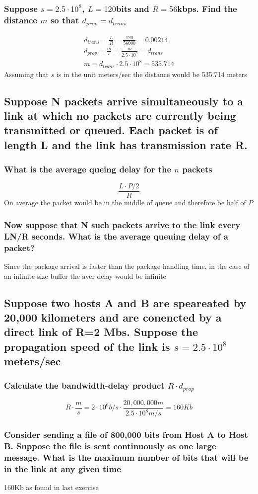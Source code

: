 \documentclass[12pt, a4paper]{article}
\begin{document}
			\subsubsection{Suppose $s=2.5\cdot 10^8$, $L=120$bits and $R=56$kbps. Find the distance $m$ so that $d_{prop}=d_{trans}$}
				\begin{align*}
					d_{trans}=\frac{L}{R}=\frac{120}{56000}=0.00214\\
					d_{prop}=\frac{m}{s}=\frac{m}{2.5\cdot 10^8}=d_{trans}\\
					m=d_{trans}\cdot 2.5\cdot 10^8=535.714
				\end{align*}
				Assuming that $s$ is in the unit meters/sec the distance would be 535.714 meters
		\subsection{Suppose N packets arrive simultaneously to a link at which no packets are currently being transmitted or queued. Each packet is of length L and the link has transmission rate R.}
			\subsubsection{What is the average queing delay for the $n$ packets}
				$$\frac{L\cdot P/2}{R}$$
				On average the packet would be in the middle of queue and therefore be half of $P$
			\subsubsection{Now suppose that N such packets arrive to the link every LN/R seconds. What is the average queuing delay of a packet?}
				Since the package arrival is faster than the package handling time, in the case of an infinite size buffer the aver delay would be infinite
		\subsection{Suppose two hosts A and B are speareated by 20,000 kilometers and are conencted by a direct link of R=2 Mbs. Suppose the propagation speed of the link is $s=2.5\cdot 10^8$ meters/sec}
			\subsubsection{Calculate the bandwidth-delay product $R\cdot d_{prop}$}
				$$R\cdot \frac{m}{s}=2\cdot 10^6b/s\cdot \frac{20,000,000m}{2.5\cdot 10^8m/s}=160Kb$$
			\subsubsection{Consider sending a file of 800,000 bits from Host A to Host B. Suppose the file is sent continuously as one large message. What is the maximum number of bits that will be in the link at any given time}
				160Kb as found in last exercise
\end{document}
